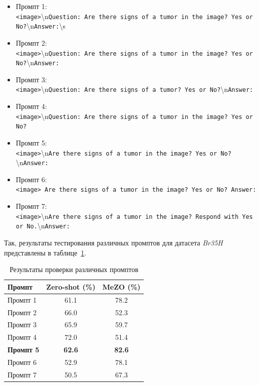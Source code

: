 \documentclass[LI,KR]{HSEUniversity}
\begin{document}
\begin{itemize}[leftmargin=10mm]
    \item Промпт 1:\\
    \small{\texttt{<image>}\textbackslash n\texttt{Question: Are there signs of a tumor in the image? Yes or No?}\textbackslash n\texttt{Answer:}\textbackslash s}

    \item Промпт 2:\\
    \small{\texttt{<image>}\textbackslash n\texttt{Question: Are there signs of a tumor in the image? Yes or No?}\textbackslash n\texttt{Answer:}}

    \item Промпт 3:\\
    \small{\texttt{<image>}\textbackslash n\texttt{Question: Are there signs of a tumor? Yes or No?}\textbackslash n\texttt{Answer:}}

    \item Промпт 4:\\
    \small{\texttt{<image>}\textbackslash n\texttt{Question: Are there signs of a tumor in the image? Yes or No?}}

    \item Промпт 5:\\
    \small{\texttt{<image>}\textbackslash n\texttt{Are there signs of a tumor in the image? Yes or No?}\textbackslash n\texttt{Answer:}}

    \item Промпт 6:\\
    \small{\texttt{<image> Are there signs of a tumor in the image? Yes or No? Answer:}}

    \item Промпт 7:\\
    \small{\texttt{<image>}\textbackslash n\texttt{Are there signs of a tumor in the image? Respond with Yes or No.}\textbackslash n\texttt{Answer:}}
\end{itemize}

Так, результаты тестирования различных промптов для датасета \textit{Br35H} представлены в таблице~\ref{tab:prompt-engineering-results}.

\begin{table}[H]
\centering
\begin{tabular}{|l|c|c|}
\hline
\textbf{Промпт} & \textbf{Zero-shot (\%)} & \textbf{MeZO (\%)} \\ \hline
Промпт 1 & 61.1 & 78.2 \\ \hline
Промпт 2 & 66.0 & 52.3 \\ \hline
Промпт 3 & 65.9 & 59.7 \\ \hline
Промпт 4 & 72.0 & 51.4 \\ \hline
\textbf{Промпт 5} & \textbf{62.6} & \textbf{82.6} \\ \hline
Промпт 6 & 52.9 & 78.1 \\ \hline
Промпт 7 & 50.5 & 67.3 \\ \hline
\end{tabular}
\caption{Результаты проверки различных промптов}
\label{tab:prompt-engineering-results}
\end{table}
\end{document}
